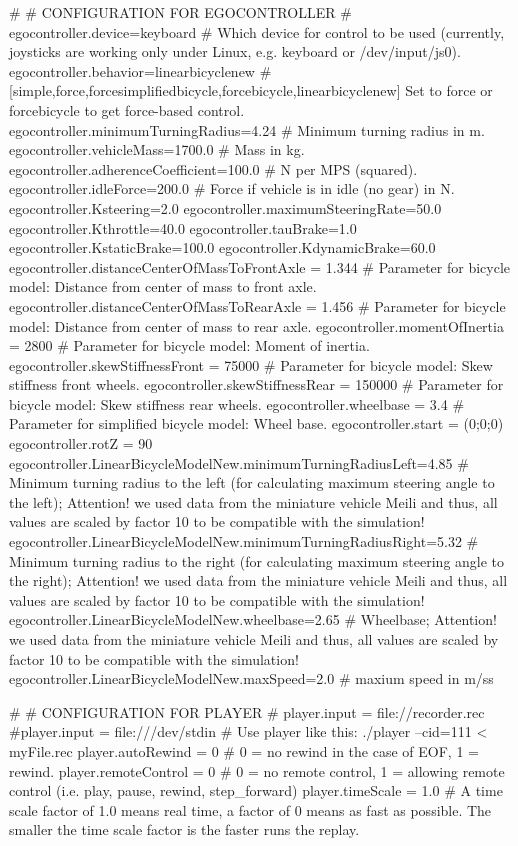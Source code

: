 #
# CONFIGURATION FOR EGOCONTROLLER
#
egocontroller.device=keyboard              # Which device for control to be used (currently, joysticks are working only under Linux, e.g. keyboard or /dev/input/js0).
egocontroller.behavior=linearbicyclenew    # [simple,force,forcesimplifiedbicycle,forcebicycle,linearbicyclenew] Set to force or forcebicycle to get force-based control.            
egocontroller.minimumTurningRadius=4.24    # Minimum turning radius in m.
egocontroller.vehicleMass=1700.0           # Mass in kg.
egocontroller.adherenceCoefficient=100.0   # N per MPS (squared).
egocontroller.idleForce=200.0              # Force if vehicle is in idle (no gear) in N.
egocontroller.Ksteering=2.0
egocontroller.maximumSteeringRate=50.0
egocontroller.Kthrottle=40.0
egocontroller.tauBrake=1.0
egocontroller.KstaticBrake=100.0
egocontroller.KdynamicBrake=60.0
egocontroller.distanceCenterOfMassToFrontAxle = 1.344 # Parameter for bicycle model: Distance from center of mass to front axle.
egocontroller.distanceCenterOfMassToRearAxle = 1.456  # Parameter for bicycle model: Distance from center of mass to rear axle.
egocontroller.momentOfInertia = 2800                  # Parameter for bicycle model: Moment of inertia.
egocontroller.skewStiffnessFront = 75000              # Parameter for bicycle model: Skew stiffness front wheels.
egocontroller.skewStiffnessRear = 150000              # Parameter for bicycle model: Skew stiffness rear wheels.
egocontroller.wheelbase = 3.4                         # Parameter for simplified bicycle model: Wheel base.
egocontroller.start = (0;0;0)
egocontroller.rotZ = 90
egocontroller.LinearBicycleModelNew.minimumTurningRadiusLeft=4.85  # Minimum turning radius to the left (for calculating maximum steering angle to the left); Attention! we used data from the miniature vehicle Meili and thus, all values are scaled by factor 10 to be compatible with the simulation!
egocontroller.LinearBicycleModelNew.minimumTurningRadiusRight=5.32 # Minimum turning radius to the right (for calculating maximum steering angle to the right); Attention! we used data from the miniature vehicle Meili and thus, all values are scaled by factor 10 to be compatible with the simulation!
egocontroller.LinearBicycleModelNew.wheelbase=2.65                 # Wheelbase; Attention! we used data from the miniature vehicle Meili and thus, all values are scaled by factor 10 to be compatible with the simulation!
egocontroller.LinearBicycleModelNew.maxSpeed=2.0                   # maxium speed in m/ss


#
# CONFIGURATION FOR PLAYER
#
player.input = file://recorder.rec
#player.input = file:///dev/stdin  # Use player like this: ./player --cid=111 < myFile.rec
player.autoRewind = 0 # 0 = no rewind in the case of EOF, 1 = rewind.
player.remoteControl = 0 # 0 = no remote control, 1 = allowing remote control (i.e. play, pause, rewind, step_forward)
player.timeScale = 1.0 # A time scale factor of 1.0 means real time, a factor of 0 means as fast as possible. The smaller the time scale factor is the faster runs the replay.


